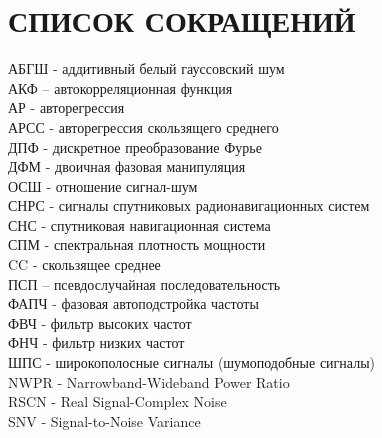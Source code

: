 \section*{СПИСОК СОКРАЩЕНИЙ}
АБГШ - аддитивный белый гауссовский шум				\\
АКФ – автокорреляционная функция				\\
АР - авторегрессия						\\
АРСС - авторегрессия скользящего среднего			\\
ДПФ - дискретное преобразование Фурье				\\
ДФМ - двоичная фазовая манипуляция				\\
ОСШ - отношение сигнал-шум 					\\
СНРС - сигналы спутниковых радионавигационных систем		\\
СНС - спутниковая навигационная система				\\
СПМ - спектральная плотность мощности				\\
CC - скользящее среднее						\\
ПСП – псевдослучайная последовательность			\\
ФАПЧ - фазовая автоподстройка частоты				\\
ФВЧ - фильтр высоких частот					\\
ФНЧ - фильтр низких частот					\\
ШПС -  широкополосные сигналы (шумоподобные сигналы)		\\

NWPR - Narrowband-Wideband Power Ratio				\\
RSCN - Real Signal-Complex Noise				\\
SNV - Signal-to-Noise Variance					\\

\newpage
